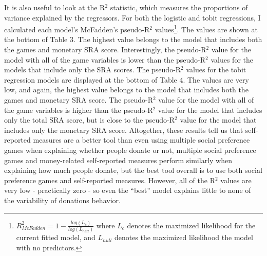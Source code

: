 \documentclass[12pt]{article}
\begin{document}
It is also useful to look at the R$^{2}$ statistic, which measures the proportions of variance explained by the regressors. For both the logistic and tobit regressions, I calculated each model\rq s McFadden\rq s pseudo-R$^{2}$ values\footnote{
\(R^{2}_{McFadden} = 1 - \frac{log(L_{c})}{log(L_{null})}\)
where \(L_{c}\) denotes the maximized likelihood for the current fitted model, and \(L_{null}\) denotes the maximized likelihood the model with no predictors.
}. The values are shown at the bottom of Table 3. The highest value belongs to the model that includes both the games and monetary SRA score. Interestingly, the pseudo-R$^{2}$ value for the model with all of the game variables is lower than the pseudo-R$^{2}$ values for the models that include only the SRA scores. The pseudo-R$^{2}$ values for the tobit regression models are displayed at the bottom of Table 4. The values are very low, and again, the highest value belongs to the model that includes both the games and monetary SRA score. The pseudo-R$^{2}$ value for the model with all of the game variables is higher than the pseudo-R$^{2}$ value for the model that includes only the total SRA score, but is close to the pseudo-R$^{2}$ value for the model that includes only the monetary SRA score. Altogether, these results tell us that self-reported measures are a better tool than even using multiple social preference games when explaining whether people donate or not, multiple social preference games and money-related self-reported measures perform similarly when explaining how much people donate, but the best tool overall is to use both social preference games and self-reported measures. However, all of the R$^{2}$ values are very low - practically zero - so even the ``best'' model explains little to none of the variability of donations behavior.
\end{document}
